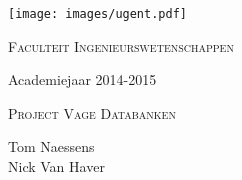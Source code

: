 \begin{titlepage}
\fontsize{12pt}{14pt}\selectfont
\begin{center}
\texttt{[image: images/ugent.pdf]}

\vspace{1cm}

\fontsize{14pt}{17pt}\selectfont
\textsc{Faculteit Ingenieurswetenschappen}
\fontsize{12pt}{14pt}\selectfont
\vspace{0.3cm}

\vspace{1.2cm}

Academiejaar 2014-2015

\vspace{3cm}

\fontsize{17.28pt}{21pt}\selectfont

{\textsc{Project Vage Databanken}}

\fontsize{12pt}{14pt}\selectfont

\vspace{4cm}

   Tom Naessens\\
   Nick Van Haver\\

\end{center}
\thispagestyle{empty}
\end{titlepage}

